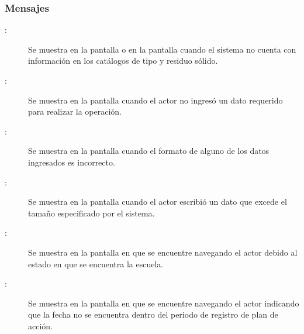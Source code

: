 \subsubsection{Mensajes}

    \begin{description}
      	    
	\item [:] Se muestra en la pantalla  o en la pantalla  cuando el sistema no cuenta con información en los catálogos de tipo y residuo sólido.
	\item[:] Se muestra en la pantalla  cuando el actor no ingresó un dato requerido para realizar la operación.
	\item[:] Se muestra en la pantalla  cuando el formato de alguno de los datos ingresados es incorrecto.
	\item[:] Se muestra en la pantalla  cuando el actor escribió un dato que excede el tamaño especificado por el sistema.
	\item[:] Se muestra en la pantalla en que se encuentre navegando el actor debido al estado en que se encuentra la escuela.	
	\item[:] Se muestra en la pantalla en que se encuentre navegando el actor indicando que la fecha no se encuentra dentro del periodo de registro de plan de acción.
	
    \end{description}
